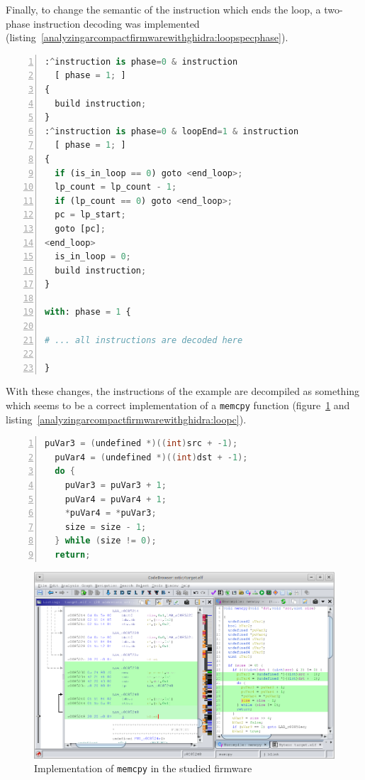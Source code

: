 Finally, to change the semantic of the instruction which ends the loop,
a two-phase instruction decoding was implemented
(listing~\ref{analyzingarcompactfirmwarewithghidra:loopspecphase}).

\begin{lstlisting}[language=Python, numbers=left, caption={SLEIGH specification of a two-phase instruction decoding pipeline}, label=analyzingarcompactfirmwarewithghidra:loopspecphase]
:^instruction is phase=0 & instruction
  [ phase = 1; ]
{
  build instruction;
}
:^instruction is phase=0 & loopEnd=1 & instruction
  [ phase = 1; ]
{
  if (is_in_loop == 0) goto <end_loop>;
  lp_count = lp_count - 1;
  if (lp_count == 0) goto <end_loop>;
  pc = lp_start;
  goto [pc];
<end_loop>
  is_in_loop = 0;
  build instruction;
}

with: phase = 1 {

# ... all instructions are decoded here

}
\end{lstlisting}

With these changes, the instructions of the example are decompiled as something which seems to be a correct implementation of a \texttt{memcpy} function (figure~\ref{fig:analyzingarcompactfirmwarewithghidra:memcpy} and listing~\ref{analyzingarcompactfirmwarewithghidra:loopc}).

\begin{lstlisting}[language=C, numbers=left, caption={Decompiled output of the instructions given in listing~\ref{analyzingarcompactfirmwarewithghidra:memcpyasm}}, label=analyzingarcompactfirmwarewithghidra:loopc]
  puVar3 = (undefined *)((int)src + -1);
  puVar4 = (undefined *)((int)dst + -1);
  do {
    puVar3 = puVar3 + 1;
    puVar4 = puVar4 + 1;
    *puVar4 = *puVar3;
    size = size - 1;
  } while (size != 0);
  return;
\end{lstlisting}

\begin{figure}[ht]
  \centering
  \includegraphics[width=\textwidth]{AnalyzingARCompactFirmwareWithGhidra/img/memcpy}
  \caption{Implementation of \texttt{memcpy} in the studied firmware}
  \label{fig:analyzingarcompactfirmwarewithghidra:memcpy}
\end{figure}

